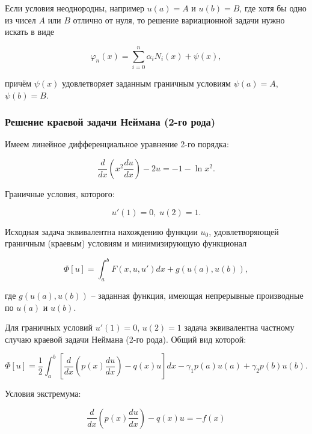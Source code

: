Если условия неоднородны, например $u(a) = A$ и $u(b) = B$, где хотя бы одно из чисел $A$ или $B$ отлично от нуля, то решение вариационной задачи нужно искать в виде

\begin{equation}\label{equation_solve_var_rank_2}
	\varphi_{n}(x) = \sum_{i=0}^n \alpha_{i}N_{i}(x) + \psi(x),
\end{equation}

\noindent причём $\psi(x)$ удовлетворяет заданным граничным условиям $\psi(a) = A$, $\psi(b) = B$.

\subsubsection{Решение краевой задачи Неймана (2-го рода)}

Имеем линейное дифференциальное уравнение 2-го порядка:

\begin{displaymath}
	\frac{d}{dx} \left( x^2 \frac{d u}{dx} \right) - 2u = -1 - \ln{x^2}.
\end{displaymath}

\noindent Граничные условия, которого:

\begin{displaymath}
	u'(1) = 0, \; u(2) = 1.
\end{displaymath}

Исходная задача эквивалентна нахождению функции $u_{0}$, удовлетворяющей граничным (краевым) условиям и минимизирующую функционал

\begin{displaymath}
	\Phi[u] = \int_{a}^{b} F(x, u, u')dx + g(u(a), u(b)),
\end{displaymath}

\noindent где $g(u(a), u(b))$ -- заданная функция, имеющая непрерывные производные по $u(a)$ и $u(b)$.

Для граничных условий $u'(1) = 0$, $u(2) = 1$ задача эквивалентна частному случаю краевой задачи Неймана (2-го рода). Общий вид которой:

\begin{displaymath}
	\Phi[u] = \frac{1}{2} \int_{a}^{b} \left[ \frac{d}{dx} \left( p(x) \frac{d u}{dx} \right) - q(x)u \right] dx - \gamma_{1} p(a) u(a) + \gamma_{2} p(b) u(b).
\end{displaymath}

\noindent Условия экстремума:

\begin{displaymath}
	\frac{d}{dx} \left( p(x) \frac{d u}{dx} \right) - q(x)u = -f(x)
\end{displaymath}

